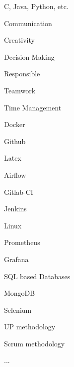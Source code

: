 \begin{cventries}
    \cventry
    {
    	\begin{cvitems}
    		C, Java, Python, etc.
    	\end{cvitems}
    }
        {}
   		{}
   		{}
   		{}
        
\end{cventries}
\begin{cventries}
    \cventry
        {}
        {}
        {}
        {}
        {
            \begin{cvitems}
                \item Communication
                \item Creativity
                \item Decision Making
                \item Responsible
                \item Teamwork
                \item Time Management
            \end{cvitems}
        }
\end{cventries}
\begin{cventries}
    \cventry
        {}
        {}
        {}
        {}
        {
            \begin{cvitems}
                \item Docker
                \item Github
                \item Latex
                \item Airflow
              	\item Gitlab-CI
              	\item Jenkins
                \item Linux
                \item Prometheus
                \item Grafana
                \item SQL based Databases
                \item MongoDB
                \item Selenium
                \item UP methodology
                \item Scrum methodology
                \item ...
            \end{cvitems}
        }
\end{cventries}
